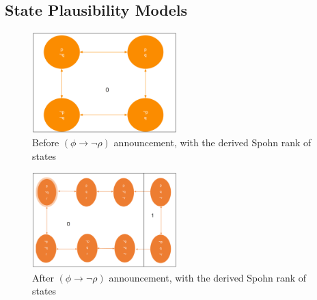 \documentclass[12pt, titlepage, twoside, a4paper]{report}
\begin{document}
\subsection{State Plausibility Models}
\quad
\newline \newline \newline
\begin{figure}[h!]
  \centering
  \includegraphics[width=0.5\textwidth]{slide25.eps}
  \caption{Before $(\phi \to \neg \rho)$ announcement, with the derived Spohn rank of states}
\end{figure}
\newline \newline \newline
\begin{figure}[h!]
  \centering
  \includegraphics[width=0.5\textwidth]{slide27.eps}
  \caption{After $(\phi \to \neg \rho)$ announcement, with the derived Spohn rank of states}
\end{figure}
\quad
\newline
\end{document}

